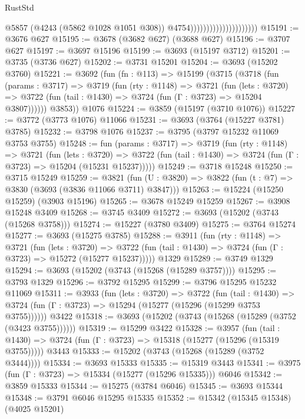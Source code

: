 \begin{lexlean}{RustStd}
\begin{coremodule}
                                              @5857
                                              (@4243 (@5862 @1028 @1051 @308))
                                              @4754)))))))))))))))))))))
@15191 := @3676 @627
@15195 := @3678 (@3682 @627) (@3688 @627)
@15196 := @3707 @627
@15197 := @3697 @15196
@15199 := @3693 (@15197 @3712)
@15201 := @3735 (@3736 @627)
@15202 := @3731 @15201
@15204 := @3693 (@15202 @3760)
@15221 := @3692
    (fun (fn : @113) =>
    @15199
      (@3715
        (@3718
          (fun (params : @3717) =>
          @3719
            (fun (rty : @1148) =>
            @3721
              (fun (lets : @3720) =>
              @3722 (fun (tail : @1430) => @3724 (fun (Γ : @3723) => @15204 @3807))))))
        @3853))
    @1076
@15224 := @3859 (@15197 (@3710 @1076))
@15227 := @3772 (@3773 @1076) @11066
@15231 := @3693 (@3764 (@15227 @3781) @3785)
@15232 := @3798 @1076
@15237 := @3795 (@3797 @15232 @11069 @3753 @3755)
@15248 := fun (params : @3717) =>
  @3719
    (fun (rty : @1148) =>
    @3721
      (fun (lets : @3720) =>
      @3722 (fun (tail : @1430) => @3724 (fun (Γ : @3723) => @15204 (@15231 @15237)))))
@15249 := @3718 @15248
@15250 := @3715 @15249
@15259 := @3821
    (fun (U : @3820) => @3822 (fun (t : @7) => @3830 (@3693 (@3836 @11066 @3711) @3847)))
@15263 := @15224 (@15250 @15259) (@3903 @15196)
@15265 := @3678 @15249 @15259
@15267 := @3908 @15248 @3409
@15268 := @3745 @3409
@15272 := @3693 (@15202 (@3743 (@15268 @3758)))
@15274 := @15227 (@3780 @3409)
@15275 := @3764 @15274
@15277 := @3693 (@15275 @3785)
@15288 := @3911
    (fun (rty : @1148) =>
    @3721
      (fun (lets : @3720) =>
      @3722 (fun (tail : @1430) => @3724 (fun (Γ : @3723) => @15272 (@15277 @15237)))))
    @1329
@15289 := @3749 @1329
@15294 := @3693 (@15202 (@3743 (@15268 (@15289 @3757))))
@15295 := @3793 @1329
@15296 := @3792 @15295
@15299 := @3796 @15295 @15232 @11069
@15311 := @3933
    (fun (lets : @3720) =>
    @3722
      (fun (tail : @1430) =>
      @3724 (fun (Γ : @3723) => @15294 (@15277 (@15296 (@15299 @3753 @3755))))))
    @3422
@15318 := @3693 (@15202 (@3743 (@15268 (@15289 (@3752 (@3423 @3755))))))
@15319 := @15299 @3422
@15328 := @3957
    (fun (tail : @1430) => @3724 (fun (Γ : @3723) => @15318 (@15277 (@15296 (@15319 @3755)))))
    @3443
@15333 := @15202 (@3743 (@15268 (@15289 (@3752 @3444))))
@15334 := @3693 @15333
@15335 := @15319 @3443
@15341 := @3975 (fun (Γ : @3723) => @15334 (@15277 (@15296 @15335))) @6046
@15342 := @3859 @15333
@15344 := @15275 (@3784 @6046)
@15345 := @3693 @15344
@15348 := @3791 @6046 @15295 @15335
@15352 := @15342 (@15345 @15348) (@4025 @15201)

\end{coremodule}
\end{lexlean}
